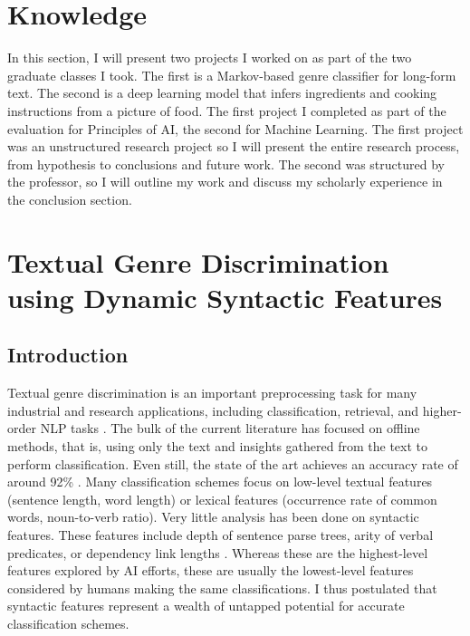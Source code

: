 \documentclass[12pt, titlepage]{article}
\begin{document}
\section{Knowledge}
In this section, I will present two projects I worked on as part of the two graduate classes I took. The first is a Markov-based genre classifier for long-form text. The second is a deep learning model that infers ingredients and cooking instructions from a picture of food. The first project I completed as part of the evaluation for Principles of AI, the second for Machine Learning. The first project was an unstructured research project so I will present the entire research process, from hypothesis to conclusions and future work. The second was structured by the professor, so I will outline my work and discuss my scholarly experience in the conclusion section.

\section{Textual Genre Discrimination using Dynamic Syntactic Features}
\subsection{Introduction}
Textual genre discrimination is an important preprocessing task for many industrial and research applications, including classification, retrieval, and higher-order NLP tasks \cite{LeeMyaeng}. The bulk of the current literature has focused on offline methods, that is, using only the text and insights gathered from the text to perform classification. Even still, the state of the art achieves an accuracy rate of around 92\% \cite{SoA}. Many classification schemes focus on low-level textual features (sentence length, word length) or lexical features (occurrence rate of common words, noun-to-verb ratio)\cite{KitchSink}. Very little analysis has been done on syntactic features. These features include depth of sentence parse trees, arity of verbal predicates, or dependency link lengths \cite{Italian}. Whereas these are the highest-level features explored by AI efforts, these are usually the lowest-level features considered by humans making the same classifications. I thus postulated that syntactic features represent a wealth of untapped potential for accurate classification schemes.
\end{document}

